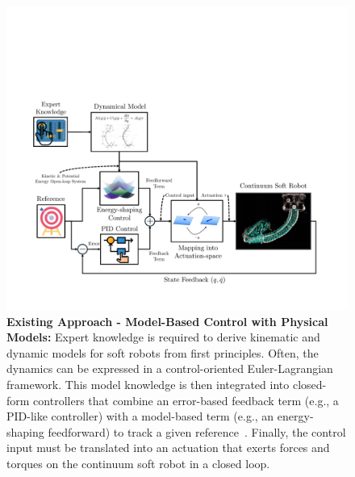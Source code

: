 \begin{figure}[ht]
    \centering
    \includegraphics[width=1.0\linewidth]{introduction/figures/model_based_control_with_physical_models_v1_cropped.pdf}
    \caption{\textbf{Existing Approach - Model-Based Control with Physical Models:}
    Expert knowledge is required to derive kinematic and dynamic models for soft robots from first principles. Often, the dynamics can be expressed in a control-oriented Euler-Lagrangian framework. This model knowledge is then integrated into closed-form controllers that combine an error-based feedback term (e.g., a PID-like controller) with a model-based term (e.g., an energy-shaping feedforward) to track a given reference~\citep{della2023model}. Finally, the control input must be translated into an actuation that exerts forces and torques on the continuum soft robot in a closed loop.
    }
    \label{fig:introduction:model_based_control_with_physical_models}
\end{figure}

